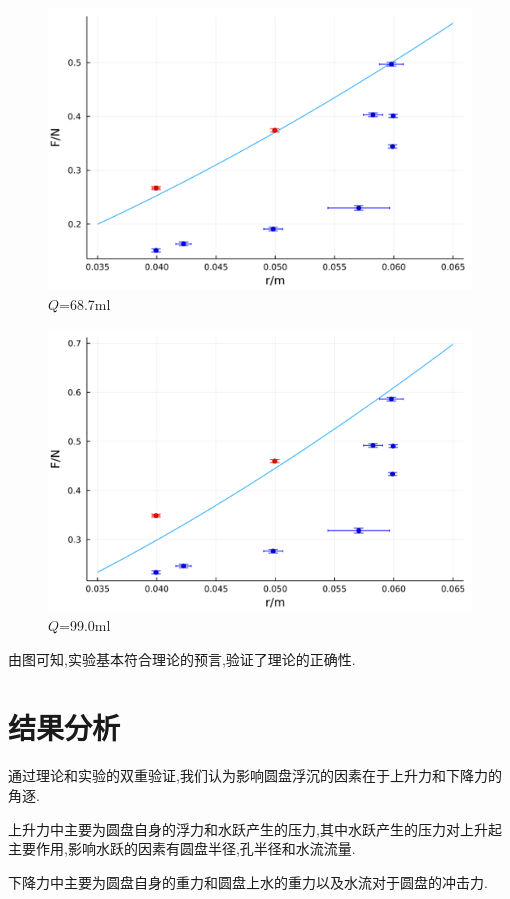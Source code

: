 \documentclass[UTF8]{gapd}
\begin{document}
\begin{figure}[!htbp]%
  \centering
  \includegraphics[width=0.8\columnwidth]{images/68.7.png}
  \caption{$Q$=68.7ml}
  \label{fig:unsinkable_disc_68.7}%
\end{figure}

\begin{figure}[!htbp]%
  \centering
  \includegraphics[width=0.8\columnwidth]{images/99.0.png}
  \caption{$Q$=99.0ml}
  \label{fig:unsinkable_disc_99.0}%
\end{figure}

由图可知,实验基本符合理论的预言,验证了理论的正确性.

\section{结果分析}
通过理论和实验的双重验证,我们认为影响圆盘浮沉的因素在于上升力和下降力的角逐.

上升力中主要为圆盘自身的浮力和水跃产生的压力,其中水跃产生的压力对上升起主要作用,影响水跃的因素有圆盘半径,孔半径和水流流量.

下降力中主要为圆盘自身的重力和圆盘上水的重力以及水流对于圆盘的冲击力.
\end{document}
